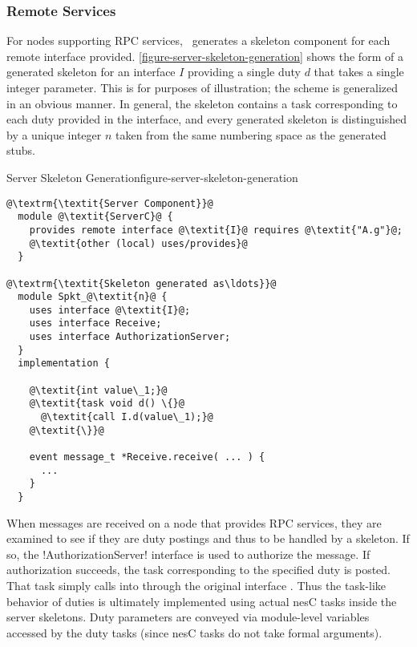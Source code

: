 \subsubsection{Remote Services}

For nodes supporting RPC services, \Sprocket\ generates a skeleton component for each remote
interface provided. \autoref{figure-server-skeleton-generation} shows the form of a generated
skeleton for an interface $I$ providing a single duty $d$ that takes a single integer parameter.
This is for purposes of illustration; the scheme is generalized in an obvious manner. In
general, the skeleton contains a task corresponding to each duty provided in the interface, and
every generated skeleton is distinguished by a unique integer $n$ taken from the same numbering
space as the generated stubs.

\begin{fpfig}[t]{Server Skeleton Generation}{figure-server-skeleton-generation}
{
\singlespace
\begin{lstlisting}[escapechar=@]
@\textrm{\textit{Server Component}}@
  module @\textit{ServerC}@ {
    provides remote interface @\textit{I}@ requires @\textit{"A.g"}@;
    @\textit{other (local) uses/provides}@
  }

@\textrm{\textit{Skeleton generated as\ldots}}@
  module Spkt_@\textit{n}@ {
    uses interface @\textit{I}@;
    uses interface Receive;
    uses interface AuthorizationServer;
  }
  implementation {

    @\textit{int value\_1;}@
    @\textit{task void d() \{}@
      @\textit{call I.d(value\_1);}@
    @\textit{\}}@

    event message_t *Receive.receive( ... ) {
      ...
    }
  }
\end{lstlisting}
\primaryspacing
}
\end{fpfig}

When messages are received on a node that provides RPC services, they are examined to see if
they are duty postings and thus to be handled by a skeleton. If so, the !AuthorizationServer!
interface is used to authorize the message. If authorization succeeds, the task corresponding to
the specified duty is posted. That task simply calls into  through the
original interface . Thus the task-like behavior of duties is ultimately
implemented using actual nesC tasks inside the server skeletons. Duty parameters are conveyed
via module-level variables accessed by the duty tasks (since nesC tasks do not take formal
arguments).

